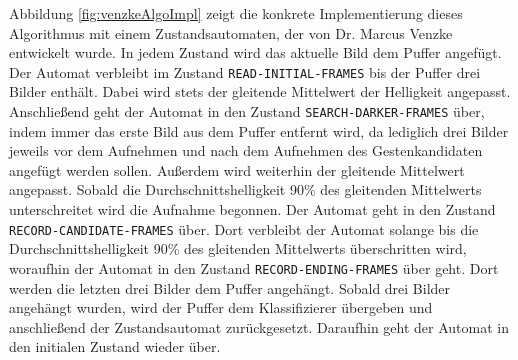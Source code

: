 \newline
\newline
Abbildung \ref{fig:venzkeAlgoImpl} zeigt die konkrete Implementierung dieses Algorithmus mit einem Zustandsautomaten, der von Dr. Marcus Venzke entwickelt wurde. In jedem Zustand wird das aktuelle Bild dem Puffer angefügt.
Der Automat verbleibt im Zustand \texttt{READ-INITIAL-FRAMES} bis der Puffer drei Bilder enthält. Dabei wird stets der gleitende Mittelwert der Helligkeit angepasst. Anschließend geht der Automat in den Zustand
\texttt{SEARCH-DARKER-FRAMES} über, indem immer das erste Bild aus dem Puffer entfernt wird, da lediglich drei Bilder jeweils vor dem Aufnehmen und nach dem Aufnehmen des
Gestenkandidaten angefügt werden sollen. Außerdem wird weiterhin der gleitende Mittelwert angepasst. Sobald die Durchschnittshelligkeit 90\% des gleitenden Mittelwerts unterschreitet wird die Aufnahme begonnen.
Der Automat geht in den Zustand \texttt{RECORD-CANDIDATE-FRAMES} über. Dort verbleibt der Automat solange bis die Durchschnittshelligkeit 90\% des gleitenden Mittelwerts überschritten wird, woraufhin der Automat
in den Zustand \texttt{RECORD-ENDING-FRAMES} über geht. Dort werden die letzten drei Bilder dem Puffer angehängt. Sobald drei Bilder angehängt wurden, wird der Puffer dem Klassifizierer übergeben und anschließend
der Zustandsautomat zurückgesetzt. Daraufhin geht der Automat in den initialen Zustand wieder über.
